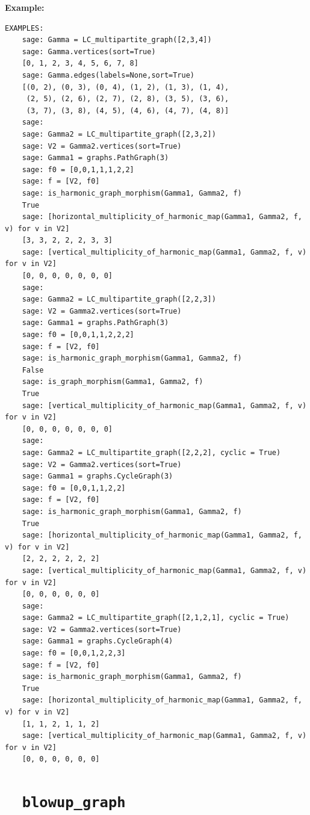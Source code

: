 \documentclass{article}
\begin{document}
\textbf{Example:}
\begin{verbatim}
EXAMPLES:
    sage: Gamma = LC_multipartite_graph([2,3,4])                                       
    sage: Gamma.vertices(sort=True)                                                             
    [0, 1, 2, 3, 4, 5, 6, 7, 8]
    sage: Gamma.edges(labels=None,sort=True)                                                     
    [(0, 2), (0, 3), (0, 4), (1, 2), (1, 3), (1, 4), 
     (2, 5), (2, 6), (2, 7), (2, 8), (3, 5), (3, 6), 
     (3, 7), (3, 8), (4, 5), (4, 6), (4, 7), (4, 8)]
    sage: 
    sage: Gamma2 = LC_multipartite_graph([2,3,2])  
    sage: V2 = Gamma2.vertices(sort=True)   
    sage: Gamma1 = graphs.PathGraph(3) 
    sage: f0 = [0,0,1,1,1,2,2] 
    sage: f = [V2, f0]       
    sage: is_harmonic_graph_morphism(Gamma1, Gamma2, f) 
    True
    sage: [horizontal_multiplicity_of_harmonic_map(Gamma1, Gamma2, f, v) for v in V2] 
    [3, 3, 2, 2, 2, 3, 3]
    sage: [vertical_multiplicity_of_harmonic_map(Gamma1, Gamma2, f, v) for v in V2]  
    [0, 0, 0, 0, 0, 0, 0]
    sage: 
    sage: Gamma2 = LC_multipartite_graph([2,2,3]) 
    sage: V2 = Gamma2.vertices(sort=True)  
    sage: Gamma1 = graphs.PathGraph(3) 
    sage: f0 = [0,0,1,1,2,2,2] 
    sage: f = [V2, f0]        
    sage: is_harmonic_graph_morphism(Gamma1, Gamma2, f) 
    False
    sage: is_graph_morphism(Gamma1, Gamma2, f) 
    True
    sage: [vertical_multiplicity_of_harmonic_map(Gamma1, Gamma2, f, v) for v in V2]
    [0, 0, 0, 0, 0, 0, 0]
    sage: 
    sage: Gamma2 = LC_multipartite_graph([2,2,2], cyclic = True)
    sage: V2 = Gamma2.vertices(sort=True) 
    sage: Gamma1 = graphs.CycleGraph(3)
    sage: f0 = [0,0,1,1,2,2]
    sage: f = [V2, f0] 
    sage: is_harmonic_graph_morphism(Gamma1, Gamma2, f)
    True
    sage: [horizontal_multiplicity_of_harmonic_map(Gamma1, Gamma2, f, v) for v in V2] 
    [2, 2, 2, 2, 2, 2]
    sage: [vertical_multiplicity_of_harmonic_map(Gamma1, Gamma2, f, v) for v in V2] 
    [0, 0, 0, 0, 0, 0]
    sage: 
    sage: Gamma2 = LC_multipartite_graph([2,1,2,1], cyclic = True)  
    sage: V2 = Gamma2.vertices(sort=True)  
    sage: Gamma1 = graphs.CycleGraph(4) 
    sage: f0 = [0,0,1,2,2,3] 
    sage: f = [V2, f0] 
    sage: is_harmonic_graph_morphism(Gamma1, Gamma2, f) 
    True
    sage: [horizontal_multiplicity_of_harmonic_map(Gamma1, Gamma2, f, v) for v in V2] 
    [1, 1, 2, 1, 1, 2]
    sage: [vertical_multiplicity_of_harmonic_map(Gamma1, Gamma2, f, v) for v in V2]
    [0, 0, 0, 0, 0, 0]
\end{verbatim}

\section{\tt \ \ blowup\_graph}
\end{document}
